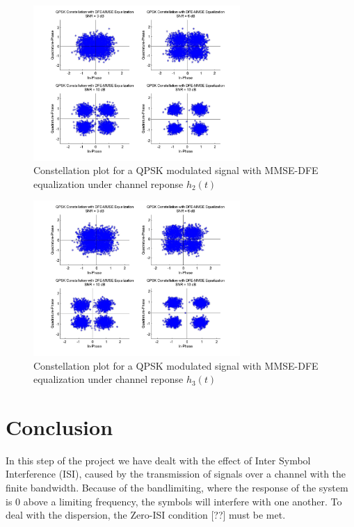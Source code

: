 \documentclass[]{article}
\begin{document}
\begin{figure}[H]
\centering
\includegraphics[width=0.7\textwidth]{qpConstDFEMMSE2.jpg}
\caption{Constellation plot for a QPSK modulated signal with MMSE-DFE equalization under channel reponse $h_2(t)$}
\end{figure}

\begin{figure}[H]
\centering
\includegraphics[width=0.7\textwidth]{qpConstDFEMMSE3.jpg}
\caption{Constellation plot for a QPSK modulated signal with MMSE-DFE equalization under channel reponse $h_3(t)$}
\end{figure}


\newpage
\section{Conclusion}
\label{sec:conc}

In this step of the project we have dealt with the effect of Inter Symbol Interference (ISI), caused by the transmission of signals over a channel with the finite bandwidth. Because of the bandlimiting, where the response of the system is 0 above a limiting frequency, the symbols will interfere with one another. To deal with the dispersion, the Zero-ISI condition [??] must be met. 
\end{document}

